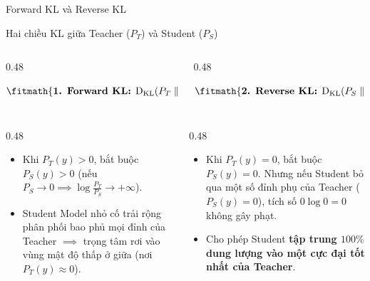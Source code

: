 \begin{frame}{Forward KL và Reverse KL}
  \begin{block}{Hai chiều KL giữa Teacher ($P_T$) và Student ($P_S$)}
  \begin{columns}[T,onlytextwidth]
    \begin{column}{0.48\textwidth}
\[
      \fitmath{%
      \text{\textbf{1. Forward KL:}} \; \DKL(P_T \parallel P_S) = \sum_{y} P_T(y) \log \frac{P_T(y)}{P_S(y)}
      }
    \]
    \end{column}
    \begin{column}{0.48\textwidth}
\[
      \fitmath{%
      \text{\textbf{2. Reverse KL:}} \; \DKL(P_S \parallel P_T) = \sum_{y} P_S(y) \log \frac{P_S(y)}{P_T(y)}
      }
    \]
    \end{column}
  \end{columns}
\end{block}

  \begin{columns}[T,onlytextwidth]
    \begin{column}{0.48\textwidth}
      \small
      \begin{itemize}\setlength{\itemsep}{4pt}
        \item Khi $P_T(y) > 0$, bắt buộc $P_S(y) > 0$ (nếu $P_S \to 0 \implies \log\frac{P_T}{P_S} \to +\infty$).
        \item Student Model nhỏ cố trải rộng phân phối bao phủ mọi đỉnh của Teacher $\implies$ trọng tâm rơi vào vùng mật độ thấp ở giữa (nơi $P_T(y) \approx 0$).
      \end{itemize}
    \end{column}
    \begin{column}{0.48\textwidth}
      \small
      \begin{itemize}\setlength{\itemsep}{4pt}
        \item Khi $P_T(y) = 0$, bắt buộc $P_S(y) = 0$. Nhưng nếu Student bỏ qua một số đỉnh phụ của Teacher ($P_S(y) = 0$), tích số $0 \log 0 = 0$ không gây phạt.
        \item Cho phép Student \textbf{tập trung $100\%$ dung lượng vào một cực đại tốt nhất của Teacher}.
      \end{itemize}
    \end{column}
  \end{columns}
  \par\vspace{0pt}
\end{frame}

